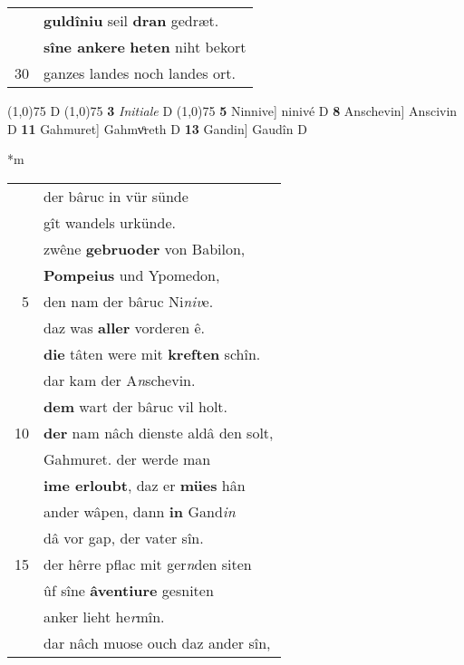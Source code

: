\documentclass[8pt,a4paper,notitlepage]{article}
\begin{document}
\begin{table}[ht]
\begin{minipage}[t]{0.5\linewidth}
\begin{tabular}{rl}
 & \textbf{guldîniu} seil \textbf{dran} gedræt.\\ 
 & \textbf{sîne ankere} \textbf{heten} niht bekort\\ 
30 & ganzes landes noch landes ort.\\ 
\end{tabular}
\scriptsize
\line(1,0){75} \newline
D \newline
\line(1,0){75} \newline
\textbf{3} \textit{Initiale} D  \newline
\line(1,0){75} \newline
\textbf{5} Ninnive] ninivé D \textbf{8} Anschevin] Anscivin D \textbf{11} Gahmuret] Gahmvͦreth D \textbf{13} Gandin] Gaudîn D \newline
\end{minipage}
\hspace{0.5cm}
\begin{minipage}[t]{0.5\linewidth}
\small
\begin{center}*m
\end{center}
\begin{tabular}{rl}
 & der bâruc in vür sünde\\ 
 & gît wandels urkünde.\\ 
 & zwêne \textbf{gebruoder} von Babilon,\\ 
 & \textbf{Pompeius} und Ypomedon,\\ 
5 & den nam der bâruc Ni\textit{niv}e.\\ 
 & daz was \textbf{aller} vorderen ê.\\ 
 & \textbf{die} tâten were mit \textbf{kreften} schîn.\\ 
 & dar kam der A\textit{n}schevin.\\ 
 & \textbf{dem} wart der bâruc vil holt.\\ 
10 & \textbf{der} nam nâch dienste aldâ den solt,\\ 
 & Gahmuret. der werde man\\ 
 & \textbf{ime erloubt}, daz er \textbf{mües} hân\\ 
 & ander wâpen, dann \textbf{in} Gand\textit{in}\\ 
 & dâ vor gap, der vater sîn.\\ 
15 & der hêrre pflac mit ger\textit{n}den siten\\ 
 & ûf sîne \textbf{âventiure} gesniten\\ 
 & anker lieht he\textit{r}mîn.\\ 
 & dar nâch muose ouch daz ander sîn,\\ 

\end{tabular}
\end{minipage}
\end{table}
\end{document}
